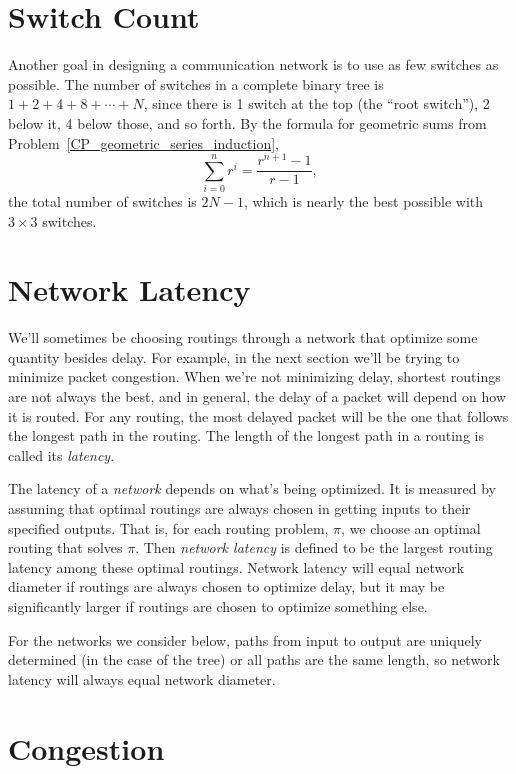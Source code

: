 \section{Switch Count}

Another goal in designing a communication network is to use as few
switches as possible.  The number of switches in a complete binary
tree is $1 + 2 + 4 + 8 + \cdots + N$, since there is 1 switch at the
top (the ``root switch''), 2 below it, 4 below those, and so forth.
By the formula for geometric sums from Problem~\ref{CP_geometric_series_induction},
\[
\sum_{i=0}^n r^i = \frac{r^{n+1}-1}{r-1},
\]
the total number of switches is $2 N - 1$, which is nearly the best
possible with $3 \times 3$ switches.

\section{Network Latency}

We'll sometimes be choosing routings through a network that optimize some
quantity besides delay.  For example, in the next section we'll be trying
to minimize packet congestion.  When we're not minimizing delay, shortest
routings are not always the best, and in general, the delay of a packet
will depend on how it is routed.  For any routing, the most delayed packet
will be the one that follows the longest path in the routing.  The length
of the longest path in a routing is called its \emph{latency}.


The latency of a \emph{network} depends on what's being optimized.  It is
measured by assuming that optimal routings are always chosen in getting
inputs to their specified outputs.  That is, for each routing problem,
$\pi$, we choose an optimal routing that solves $\pi$.  Then \emph{network
  latency} is defined to be the largest routing latency among these
optimal routings.  Network latency will equal network diameter if routings
are always chosen to optimize delay, but it may be significantly larger if
routings are chosen to optimize something else.

For the networks we consider below, paths from input to output are
uniquely determined (in the case of the tree) or all paths are the same
length, so network latency will always equal network diameter.


\section{Congestion}

